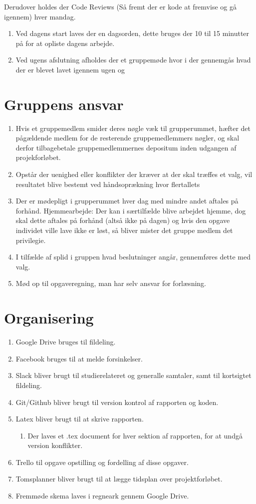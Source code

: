 Derudover holdes der Code Reviews (Så fremt der er kode at fremvise og gå igennem) hver mandag.

\begin{enumerate}
\item Ved dagens start laves der en dagsorden, dette bruges der 10 til 15 minutter på for at opliste dagens arbejde.
\item Ved ugens afslutning afholdes der et gruppemøde hvor i der gennemgås hvad der er blevet lavet igennem ugen og 
\end{enumerate}
\section{Gruppens ansvar}
\begin{enumerate}
\item Hvis et gruppemedlem smider deres nøgle væk til grupperummet, hæfter det pågældende medlem for de resterende gruppemedlemmers nøgler, og skal derfor tilbagebetale gruppemedlemmernes depositum inden udgangen af projekforløbet.
\item Opstår der uenighed eller konflikter der kræver at der skal træffes et valg, vil resultatet blive bestemt ved håndsoprækning hvor flertallets
\item Der er mødepligt i grupperummet hver dag med mindre andet aftales på forhånd.
Hjemmearbejde: Der kan i særtilfælde blive arbejdet hjemme, dog skal dette aftales på forhånd (altså ikke på dagen) og hvis den opgave individet ville lave ikke er løst, så bliver mister det gruppe medlem det privilegie.
\item I tilfælde af splid i gruppen hvad beslutninger angår, gennemføres dette med valg.
\item Mød op til opgaveregning, man har selv ansvar for forlæsning.
\end{enumerate}

\section{Organisering}
\begin{enumerate}
\item Google Drive bruges til fildeling.
\item Facebook bruges til at melde forsinkelser.
\item Slack bliver brugt til studierelateret og generalle samtaler, samt til kortsigtet fildeling.
\item Git/Github bliver brugt til version kontrol af rapporten og koden.
\item Latex bliver brugt til at skrive rapporten.
\begin{enumerate}
\item Der laves et .tex document for hver sektion af rapporten, for at undgå version konflikter.
\end{enumerate}
\item Trello til opgave opstilling og fordelling af disse opgaver.
\item Tomsplanner bliver brugt til at lægge tidsplan over projektforløbet.
\item Fremmøde skema laves i regneark gennem Google Drive.
\end{enumerate}

